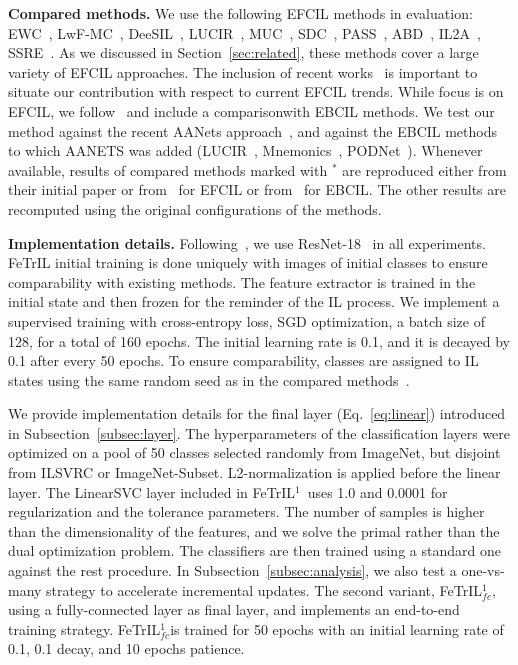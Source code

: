 \documentclass[10pt,twocolumn,letterpaper]{article}
\makeatletter
\newcommand{\ourmodel}{FeTrIL\@\xspace}
\newcommand{\ourmodelone}{FeTrIL$^1$~}
\newcommand{\ourmodeloneFcNospace}{FeTrIL$^1_{fc}$}
\makeatother
\begin{document}
\textbf{Compared methods.} We use the following EFCIL methods in evaluation: EWC~\cite{kirkpatrick2017overcoming}, LwF-MC~\cite{rebuffi2017_icarl}, DeeSIL~\cite{belouadah2018_deesil}, LUCIR~\cite{hou2019_lucir}, MUC~\cite{liu2020more}, SDC~\cite{sdc_2020}, PASS~\cite{zhu2021pass}, ABD~\cite{smith2021always}, IL2A~\cite{zhu2021class}, SSRE~\cite{zhu2022self}.
As we discussed in Section~\ref{sec:related}, these methods cover a large variety of EFCIL approaches.
The inclusion of recent works~\cite{zhu2021class,zhu2021pass,zhu2022self} is important to situate our contribution with respect to current EFCIL trends. 
While focus is on EFCIL, we follow~\cite{zhu2022self} and include a comparisonwith EBCIL methods. 
We test our method against the recent AANets approach~\cite{liu2021aanets}, and against the EBCIL methods to which AANETS was added (LUCIR~\cite{hou2019_lucir}, Mnemonics~\cite{mnemonics_2020}, PODNet~\cite{douillard2020podnet}).
Whenever available, results of compared methods marked with $^*$ are reproduced either from their initial paper or from~\cite{zhu2022self} for EFCIL or from~\cite{liu2021aanets} for EBCIL. 
The other results are recomputed using the original 
configurations of the methods.

\textbf{Implementation details.} Following~\cite{rebuffi2017_icarl,zhu2021class,zhu2021pass,zhu2022self}, we use ResNet-18~\cite{he2016_resnet} in all experiments.
\ourmodel initial training is done uniquely with images of initial classes to ensure comparability with existing methods.
The feature extractor is trained in the initial state and then frozen for the reminder of the IL process. 
We implement a supervised training with cross-entropy loss, SGD optimization, a batch size of 128, for a total of 160 epochs.
The initial learning rate is 0.1, and it is decayed by 0.1 after every 50 epochs. 
To ensure comparability, classes are assigned to IL states using the same random seed as in the compared methods~\cite{hou2019_lucir,zhu2021pass,zhu2021class,zhu2022self}. 

We provide implementation details for the final layer (Eq.~\ref{eq:linear}) introduced in Subsection~\ref{subsec:layer}.
The hyperparameters of the classification layers were optimized on a pool of 50 classes selected randomly from ImageNet, but disjoint from ILSVRC or ImageNet-Subset. 
L2-normalization is applied before the linear layer.
The LinearSVC layer included in \ourmodelone uses 1.0 and 0.0001 for 
regularization and the tolerance parameters.
The number of samples is higher than the dimensionality of the features, and we solve the primal rather than the dual optimization problem.
The classifiers are then trained using a standard one against the rest procedure.
In Subsection~\ref{subsec:analysis}, we also test a one-vs-many strategy to accelerate incremental updates.
The second variant, \ourmodeloneFcNospace, using a fully-connected layer as final layer, and implements an end-to-end training strategy. 
\ourmodeloneFcNospace is trained for 50 epochs with an initial learning rate of 0.1, 0.1 decay, and 10 epochs patience.
\end{document}
